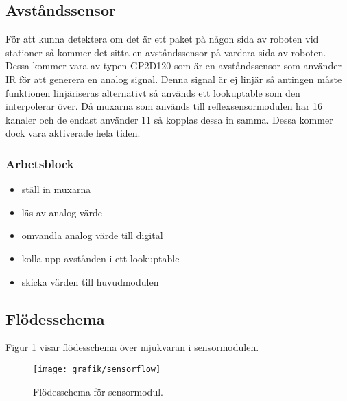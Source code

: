 \subsection{Avståndssensor}
För att kunna detektera om det är ett paket på någon sida av roboten vid stationer så kommer det sitta en avståndssensor på vardera sida av roboten. Dessa kommer vara av typen GP2D120 som är en avståndssensor som använder IR för att generera en analog signal. Denna signal är ej linjär så antingen måste funktionen linjäriseras alternativt så används ett lookuptable som den interpolerar över. Då muxarna som används till reflexsensormodulen har 16 kanaler och de endast använder 11 så kopplas dessa in samma. Dessa kommer dock vara aktiverade hela tiden.
\subsubsection{Arbetsblock}
\begin{itemize}
\item ställ in muxarna
\item läs av analog värde
\item omvandla analog värde till digital
\item kolla upp avstånden i ett lookuptable
\item skicka värden till huvudmodulen
\end{itemize}

\newpage
\subsection{Flödesschema}
Figur \ref{systemskiss:sensorschema} visar flödesschema över mjukvaran i sensormodulen.


\begin{figure}[h]
\center
\texttt{[image: grafik/sensorflow]}
\caption{Flödesschema för sensormodul.} \label{systemskiss:sensorschema}
\end{figure}

%
